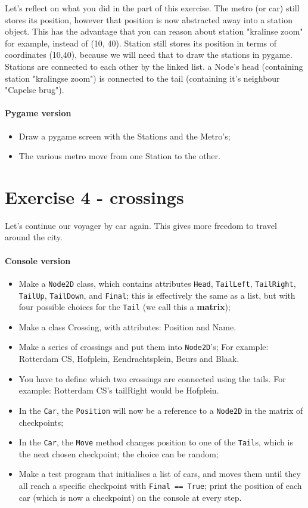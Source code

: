 \documentclass[12pt,a4paper]{article}
\begin{document}
		    Let's reflect on what you did in the part of this exercise.
		    The metro (or car) still stores its position, however that position is now abstracted away into a station object.
		    This has the advantage that you can reason about station "kralinse zoom" for example, instead of (10, 40).
		    Station still stores its position in terms of coordinates (10,40), because we will need that to draw the stations in pygame.
		    Stations are connected to each other by the linked list. a Node's head (containing station "kralingse zoom") is connected to the tail (containing it's neighbour "Capelse brug").


		\paragraph*{Pygame version}
			\begin{itemize}
				\item Draw a pygame screen with the Stations and the Metro's;
				\item The various metro move from one Station to the other.
			\end{itemize}

	\section{Exercise 4 - crossings}
	    Let's continue our voyager by car again. This gives more freedom to travel around the city.
		\paragraph*{Console version}
			\begin{itemize}
				\item Make a \texttt{Node2D} class,
				        which contains attributes
				            \texttt{Head}, \texttt{TailLeft}, \texttt{TailRight}, \texttt{TailUp}, \texttt{TailDown}, and \texttt{Final};
				        this is effectively the same as a list,
				        but with four possible choices for the \texttt{Tail} (we call this a \textbf{matrix});
				\item Make a class Crossing, with attributes: Position and Name.
				\item Make a series of crossings and put them into \texttt{Node2D}'s; For example: Rotterdam CS, Hofplein, Eendrachtsplein, Beurs and Blaak.
				\item You have to define which two crossings are connected using the tails. For example: Rotterdam CS's tailRight would be Hofplein.
				\item In the \texttt{Car}, the \texttt{Position} will now be a reference to a \texttt{Node2D} in the matrix of checkpoints;
				\item In the \texttt{Car}, the \texttt{Move} method changes position to one of the \texttt{Tail}s, which is the next chosen checkpoint; the choice can be random;
				\item Make a test program that initialises a list of cars, and moves them until they all reach a specific checkpoint with \texttt{Final == True}; print the position of each car (which is now a checkpoint) on the console at every step.
			\end{itemize}
			
\end{document}

